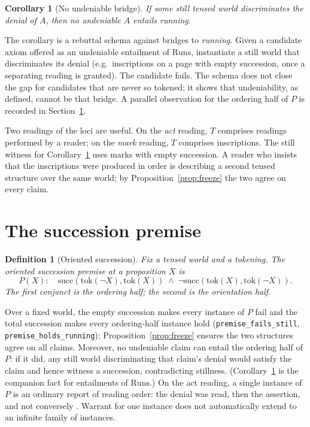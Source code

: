 \documentclass[11pt]{article}
\newtheorem{definition}[theorem]{Definition}
\newtheorem{corollary}[theorem]{Corollary}
\newcommand{\lf}[1]{\texttt{#1}}
\begin{document}
\begin{corollary}[No undeniable bridge]
\label{cor:nobridge}
If some still tensed world discriminates the denial of \(A\), then no
undeniable \(A\) entails running.
\end{corollary}

The corollary is a rebuttal schema against bridges to \emph{running}. Given a
candidate axiom offered as an undeniable entailment of \(\mathrm{Runs}\),
instantiate a still world that discriminates its denial (e.g.\ inscriptions on
a page with empty succession, once a separating reading is granted). The
candidate fails. The schema does not close the gap for candidates that are
never so tokened; it shows that undeniability, as defined, cannot be that
bridge. A parallel observation for the ordering half of \(P\) is recorded in
Section~\ref{sec:premise}.

Two readings of the loci are useful. On the \emph{act} reading, \(T\) comprises
readings performed by a reader; on the \emph{mark} reading, \(T\) comprises
inscriptions. The still witness for Corollary~\ref{cor:nobridge} uses marks
with empty succession. A reader who insists that the inscriptions were produced
in order is describing a second tensed structure over the same world; by
Proposition~\ref{prop:freeze} the two agree on every claim.

\section{The succession premise}
\label{sec:premise}

\begin{definition}[Oriented succession]
\label{def:P}
Fix a tensed world and a tokening. The \emph{oriented succession premise} at a
proposition \(X\) is
\[
P(X):\quad
\mathrm{succ}(\mathrm{tok}(\lnot X),\mathrm{tok}(X))
\;\land\;
\lnot\mathrm{succ}(\mathrm{tok}(X),\mathrm{tok}(\lnot X)).
\]
The first conjunct is the ordering half; the second is the orientation half.
\end{definition}

Over a fixed world, the empty succession makes every instance of \(P\) fail and
the total succession makes every ordering-half instance hold
(\lf{premise\_fails\_still}, \lf{premise\_holds\_running});
Proposition~\ref{prop:freeze} ensures the two structures agree on all claims.
Moreover, no undeniable claim can entail the ordering half of \(P\): if it did,
any still world discriminating that claim's denial would satisfy the claim and
hence witness a succession, contradicting stillness. (Corollary~\ref{cor:nobridge}
is the companion fact for entailments of \(\mathrm{Runs}\).) On the act
reading, a single instance of \(P\) is an ordinary report of reading order: the
denial was read, then the assertion, and not conversely \cite{moore1925}.
Warrant for one instance does not automatically extend to an infinite family of
instances.
\end{document}

